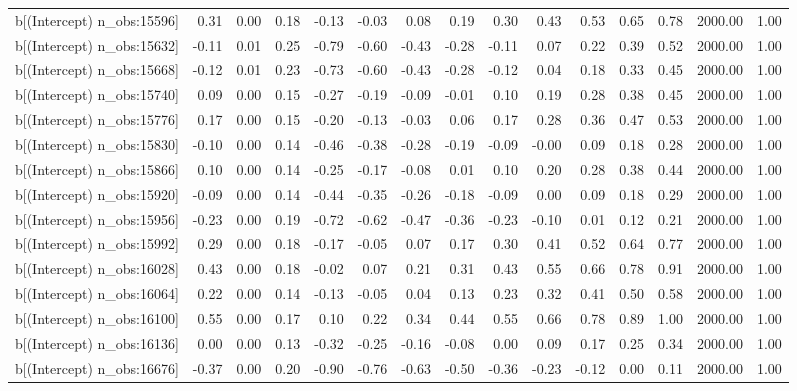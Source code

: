 \begin{table}[ht]
\begin{tabular}{rrrrrrrrrrrrrrr}
  b[(Intercept) n\_obs:15596] & 0.31 & 0.00 & 0.18 & -0.13 & -0.03 & 0.08 & 0.19 & 0.30 & 0.43 & 0.53 & 0.65 & 0.78 & 2000.00 & 1.00 \\ 
  b[(Intercept) n\_obs:15632] & -0.11 & 0.01 & 0.25 & -0.79 & -0.60 & -0.43 & -0.28 & -0.11 & 0.07 & 0.22 & 0.39 & 0.52 & 2000.00 & 1.00 \\ 
  b[(Intercept) n\_obs:15668] & -0.12 & 0.01 & 0.23 & -0.73 & -0.60 & -0.43 & -0.28 & -0.12 & 0.04 & 0.18 & 0.33 & 0.45 & 2000.00 & 1.00 \\ 
  b[(Intercept) n\_obs:15740] & 0.09 & 0.00 & 0.15 & -0.27 & -0.19 & -0.09 & -0.01 & 0.10 & 0.19 & 0.28 & 0.38 & 0.45 & 2000.00 & 1.00 \\ 
  b[(Intercept) n\_obs:15776] & 0.17 & 0.00 & 0.15 & -0.20 & -0.13 & -0.03 & 0.06 & 0.17 & 0.28 & 0.36 & 0.47 & 0.53 & 2000.00 & 1.00 \\ 
  b[(Intercept) n\_obs:15830] & -0.10 & 0.00 & 0.14 & -0.46 & -0.38 & -0.28 & -0.19 & -0.09 & -0.00 & 0.09 & 0.18 & 0.28 & 2000.00 & 1.00 \\ 
  b[(Intercept) n\_obs:15866] & 0.10 & 0.00 & 0.14 & -0.25 & -0.17 & -0.08 & 0.01 & 0.10 & 0.20 & 0.28 & 0.38 & 0.44 & 2000.00 & 1.00 \\ 
  b[(Intercept) n\_obs:15920] & -0.09 & 0.00 & 0.14 & -0.44 & -0.35 & -0.26 & -0.18 & -0.09 & 0.00 & 0.09 & 0.18 & 0.29 & 2000.00 & 1.00 \\ 
  b[(Intercept) n\_obs:15956] & -0.23 & 0.00 & 0.19 & -0.72 & -0.62 & -0.47 & -0.36 & -0.23 & -0.10 & 0.01 & 0.12 & 0.21 & 2000.00 & 1.00 \\ 
  b[(Intercept) n\_obs:15992] & 0.29 & 0.00 & 0.18 & -0.17 & -0.05 & 0.07 & 0.17 & 0.30 & 0.41 & 0.52 & 0.64 & 0.77 & 2000.00 & 1.00 \\ 
  b[(Intercept) n\_obs:16028] & 0.43 & 0.00 & 0.18 & -0.02 & 0.07 & 0.21 & 0.31 & 0.43 & 0.55 & 0.66 & 0.78 & 0.91 & 2000.00 & 1.00 \\ 
  b[(Intercept) n\_obs:16064] & 0.22 & 0.00 & 0.14 & -0.13 & -0.05 & 0.04 & 0.13 & 0.23 & 0.32 & 0.41 & 0.50 & 0.58 & 2000.00 & 1.00 \\ 
  b[(Intercept) n\_obs:16100] & 0.55 & 0.00 & 0.17 & 0.10 & 0.22 & 0.34 & 0.44 & 0.55 & 0.66 & 0.78 & 0.89 & 1.00 & 2000.00 & 1.00 \\ 
  b[(Intercept) n\_obs:16136] & 0.00 & 0.00 & 0.13 & -0.32 & -0.25 & -0.16 & -0.08 & 0.00 & 0.09 & 0.17 & 0.25 & 0.34 & 2000.00 & 1.00 \\ 
  b[(Intercept) n\_obs:16676] & -0.37 & 0.00 & 0.20 & -0.90 & -0.76 & -0.63 & -0.50 & -0.36 & -0.23 & -0.12 & 0.00 & 0.11 & 2000.00 & 1.00 \\ 

\end{tabular}
\end{table}
